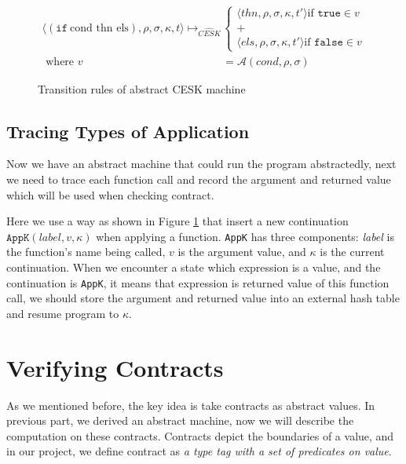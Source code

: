 \documentclass[paper=a4, fontsize=11pt]{scrartcl} %
\numberwithin{equation}{section} %
\numberwithin{figure}{section} %
\numberwithin{table}{section} %
\begin{document}
\begin{figure}[h!]
\begin{align*}
\langle (\texttt{if}~\text{cond thn els}), \rho, \sigma, \kappa, t \rangle \longmapsto_{\widehat{CESK}} &
\begin{cases}
\langle thn, \rho, \sigma, \kappa, t' \rangle \text{if } \texttt{true} \in v \\
+ \\
\langle els, \rho, \sigma, \kappa, t' \rangle \text{if } \texttt{false} \in v
\end{cases} \\
\text{ where } v & = \mathcal{A}(cond, \rho, \sigma)
\end{align*}
\caption{Transition rules of abstract CESK machine}
\label{fig:transabs}
\end{figure}

\subsection{Tracing Types of Application}

Now we have an abstract machine that could run the program abstractedly, next we need to trace each function call and record the argument and returned value which will be used when checking contract. 

Here we use a way as shown in Figure \ref{fig:transabs} that insert a new continuation $\texttt{AppK}(label, v, \kappa)$ when applying a function. \texttt{AppK} has three components: \textit{label} is the function's name being called, $v$ is the argument value, and $\kappa$ is the current continuation. When we encounter a state which expression is a value, and the continuation is \texttt{AppK}, it means that expression is returned value of this function call, we should store the argument and returned value into an external hash table and resume program to $\kappa$.



\section{Verifying Contracts}

As we mentioned before, the key idea is take contracts as abstract values. In previous part, we derived an abstract machine, now we will describe the computation on these contracts. Contracts depict the boundaries of a value, and in our project, we define contract as \textit{a type tag with a set of predicates on value}.
\end{document}
